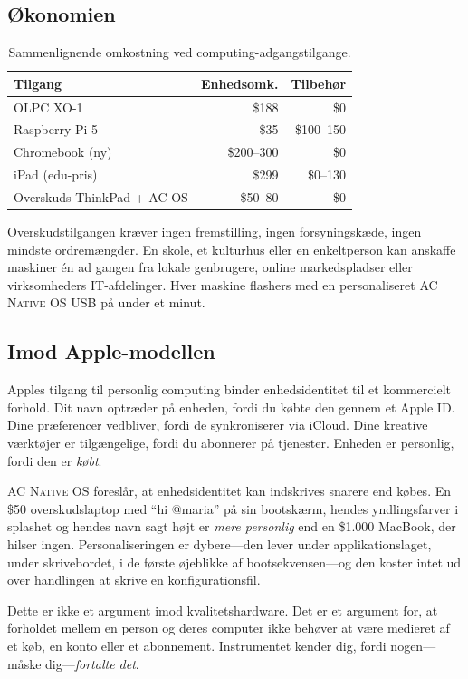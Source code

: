 \documentclass[10pt,letterpaper,twocolumn]{article}
\newcommand{\acos}{\textsc{AC Native OS}}
\begin{document}
\subsection{Økonomien}

\begin{table}[h]
\small\centering
\begin{tabular}{lrr}
\toprule
\textbf{Tilgang} & \textbf{Enhedsomk.} & \textbf{Tilbehør} \\
\midrule
OLPC XO-1 & \$188 & \$0 \\
Raspberry Pi 5 & \$35 & \$100--150 \\
Chromebook (ny) & \$200--300 & \$0 \\
iPad (edu-pris) & \$299 & \$0--130 \\
Overskuds-ThinkPad + AC OS & \$50--80 & \$0 \\
\bottomrule
\end{tabular}
\caption{Sammenlignende omkostning ved computing-adgangstilgange.}
\label{tab:cost}
\end{table}

Overskudstilgangen kræver ingen fremstilling, ingen forsyningskæde, ingen mindste ordremængder. En skole, et kulturhus eller en enkeltperson kan anskaffe maskiner én ad gangen fra lokale genbrugere, online markedspladser eller virksomheders IT-afdelinger. Hver maskine flashers med en personaliseret \acos{} USB på under et minut.

\subsection{Imod Apple-modellen}

Apples tilgang til personlig computing binder enhedsidentitet til et kommercielt forhold. Dit navn optræder på enheden, fordi du købte den gennem et Apple ID. Dine præferencer vedbliver, fordi de synkroniserer via iCloud. Dine kreative værktøjer er tilgængelige, fordi du abonnerer på tjenester. Enheden er personlig, fordi den er \emph{købt}.

\acos{} foreslår, at enhedsidentitet kan indskrives snarere end købes. En \$50 overskudslaptop med ``hi @maria'' på sin bootskærm, hendes yndlingsfarver i splashet og hendes navn sagt højt er \emph{mere personlig} end en \$1.000 MacBook, der hilser ingen. Personaliseringen er dybere---den lever under applikationslaget, under skrivebordet, i de første øjeblikke af bootsekvensen---og den koster intet ud over handlingen at skrive en konfigurationsfil.

Dette er ikke et argument imod kvalitetshardware. Det er et argument for, at forholdet mellem en person og deres computer ikke behøver at være medieret af et køb, en konto eller et abonnement. Instrumentet kender dig, fordi nogen---måske dig---\emph{fortalte det}.
\end{document}
